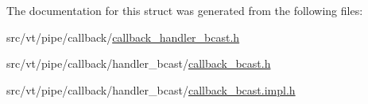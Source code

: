 The documentation for this struct was generated from the following files\+:\begin{DoxyCompactItemize}
\item 
src/vt/pipe/callback/\hyperlink{callback__handler__bcast_8h}{callback\+\_\+handler\+\_\+bcast.\+h}\item 
src/vt/pipe/callback/handler\+\_\+bcast/\hyperlink{callback__bcast_8h}{callback\+\_\+bcast.\+h}\item 
src/vt/pipe/callback/handler\+\_\+bcast/\hyperlink{callback__bcast_8impl_8h}{callback\+\_\+bcast.\+impl.\+h}\end{DoxyCompactItemize}
